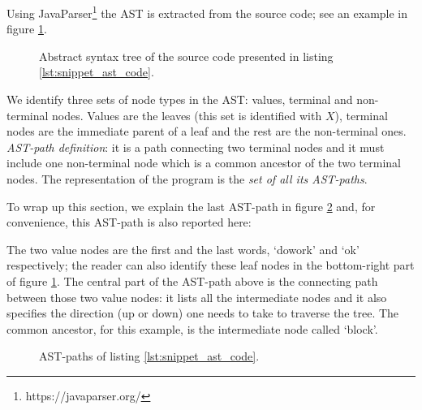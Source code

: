 Using JavaParser\footnote{https://javaparser.org/} the AST is extracted from the source code; see an example in figure  \ref{fig:AST_graphviz}.


\begin{figure}
 \centering
 \resizebox{\columnwidth}{!}{
 
 }
 \caption[AST for listing \ref{lst:snippet_ast_code}.]{Abstract syntax tree of the source code presented in listing \ref{lst:snippet_ast_code}.}
 \label{fig:AST_graphviz}
\end{figure}

	
We identify three sets of node types in the AST: values, terminal and non-terminal nodes. Values are the leaves (this set is identified with $X$), terminal nodes are the immediate parent of a leaf and the rest are the non-terminal ones.
\textit{AST-path definition}: it is a path connecting two terminal nodes and it must include one non-terminal node which is a common ancestor of the two terminal nodes. 
The representation of the program is the \textit{set of all its AST-paths}. 

To wrap up this section, we explain the last AST-path in figure \ref{fig:AST_paths} and, for convenience, this AST-path is also reported here:

\begin{center}
\end{center}

The two value nodes are the first and the last words, `dowork' and `ok' respectively; the reader can also identify these leaf nodes in the bottom-right part of figure \ref{fig:AST_graphviz}.
The central part of the AST-path above is the connecting path between those two value nodes: it lists all the intermediate nodes and it also specifies the direction (up or down) one needs to take to traverse the tree. The common ancestor, for this example, is the intermediate node called `block'.

\begin{figure}
 \centering
 \caption[All AST-paths for listing \ref{lst:snippet_ast_code}.]{AST-paths of listing \ref{lst:snippet_ast_code}.}
    \label{fig:AST_paths}
\end{figure}

